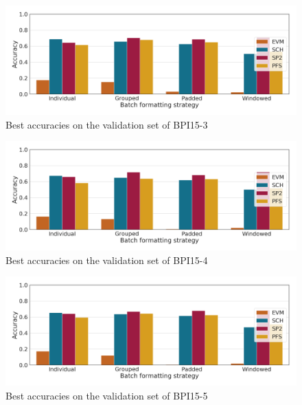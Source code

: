 \begin{figure}
    \centering
    \includegraphics[width=\textwidth]{gfx/bpic2015_3/accuracies.png}
    \caption{Best accuracies on the validation set of BPI15-3}
    \label{fig:max-accuracies-bpic2015-3}
\end{figure}
\begin{figure}
    \centering
    \includegraphics[width=\textwidth]{gfx/bpic2015_4/accuracies.png}
    \caption{Best accuracies on the validation set of BPI15-4}
    \label{fig:max-accuracies-bpic2015-4}
\end{figure}
\begin{figure}
    \centering
    \includegraphics[width=\textwidth]{gfx/bpic2015_5/accuracies.png}
    \caption{Best accuracies on the validation set of BPI15-5}
    \label{fig:max-accuracies-bpic2015-5}
\end{figure}
